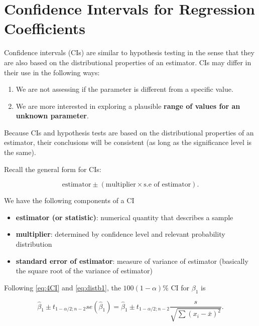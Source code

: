 \documentclass[
]{book}
\providecommand{\tightlist}{%
  \setlength{\itemsep}{0pt}\setlength{\parskip}{0pt}}
\begin{document}
\hypertarget{confidence-intervals-for-regression-coefficients}{%
\section{Confidence Intervals for Regression Coefficients}\label{confidence-intervals-for-regression-coefficients}}

Confidence intervals (CIs) are similar to hypothesis testing in the sense that they are also based on the distributional properties of an estimator. CIs may differ in their use in the following ways:

\begin{enumerate}
\def\labelenumi{\arabic{enumi}.}
\tightlist
\item
  We are not assessing if the parameter is different from a specific value.
\item
  We are more interested in exploring a plausible \textbf{range of values for an unknown parameter}.
\end{enumerate}

Because CIs and hypothesis tests are based on the distributional properties of an estimator, their conclusions will be consistent (as long as the significance level is the same).

Recall the general form for CIs:

\begin{equation} 
\mbox{estimator} \pm (\mbox{multiplier} \times \mbox{s.e of estimator}). 
\label{eq:4CI}
\end{equation}

We have the following components of a CI

\begin{itemize}
\tightlist
\item
  \textbf{estimator (or statistic)}: numerical quantity that describes a sample
\item
  \textbf{multiplier}: determined by confidence level and relevant probability distribution
\item
  \textbf{standard error of estimator}: measure of variance of estimator (basically the square root of the variance of estimator)
\end{itemize}

Following \eqref{eq:4CI} and \eqref{eq:distb1}, the \(100(1-\alpha)\%\) CI for \(\beta_1\) is

\begin{equation} 
\hat{\beta}_1 \pm t_{1-\alpha/2;n-2}  se(\hat{\beta}_1) = \hat{\beta}_1 \pm t_{1-\alpha/2;n-2} \frac{s}{\sqrt{\sum(x_i - \bar{x})^{2}}}.
\label{eq:4CIb1}
\end{equation}
\end{document}
